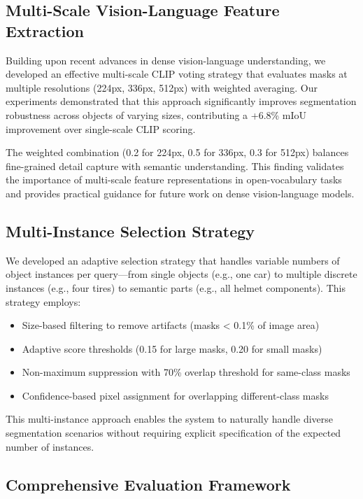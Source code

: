 \subsection{Multi-Scale Vision-Language Feature Extraction}

Building upon recent advances in dense vision-language understanding, we developed an effective multi-scale CLIP voting strategy that evaluates masks at multiple resolutions (224px, 336px, 512px) with weighted averaging. Our experiments demonstrated that this approach significantly improves segmentation robustness across objects of varying sizes, contributing a +6.8\% mIoU improvement over single-scale CLIP scoring.

The weighted combination (0.2 for 224px, 0.5 for 336px, 0.3 for 512px) balances fine-grained detail capture with semantic understanding. This finding validates the importance of multi-scale feature representations in open-vocabulary tasks and provides practical guidance for future work on dense vision-language models.

\subsection{Multi-Instance Selection Strategy}

We developed an adaptive selection strategy that handles variable numbers of object instances per query—from single objects (e.g., one car) to multiple discrete instances (e.g., four tires) to semantic parts (e.g., all helmet components). This strategy employs:

\begin{itemize}
    \item Size-based filtering to remove artifacts (masks < 0.1\% of image area)
    \item Adaptive score thresholds (0.15 for large masks, 0.20 for small masks)
    \item Non-maximum suppression with 70\% overlap threshold for same-class masks
    \item Confidence-based pixel assignment for overlapping different-class masks
\end{itemize}

This multi-instance approach enables the system to naturally handle diverse segmentation scenarios without requiring explicit specification of the expected number of instances.

\subsection{Comprehensive Evaluation Framework}

